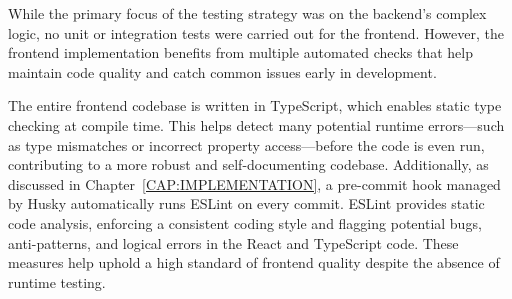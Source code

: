 While the primary focus of the testing strategy was on the backend's complex logic, no unit or integration tests were carried out for the frontend. However, the frontend implementation benefits from multiple automated checks that help maintain code quality and catch common issues early in development. 

The entire frontend codebase is written in TypeScript, which enables static type checking at compile time. This helps detect many potential runtime errors---such as type mismatches or incorrect property access---before the code is even run, contributing to a more robust and self-documenting codebase. Additionally, as discussed in Chapter~\ref{CAP:IMPLEMENTATION}, a pre-commit hook managed by Husky automatically runs ESLint on every commit. ESLint provides static code analysis, enforcing a consistent coding style and flagging potential bugs, anti-patterns, and logical errors in the React and TypeScript code. These measures help uphold a high standard of frontend quality despite the absence of runtime testing.